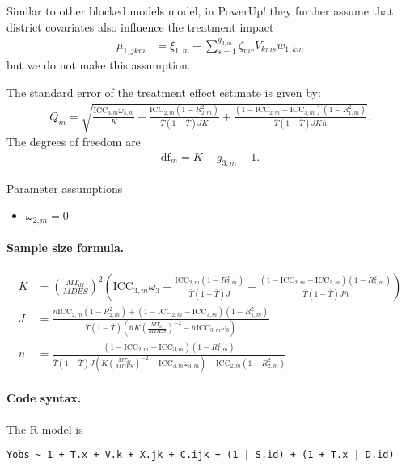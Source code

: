\documentclass[12pt]{article}
\begin{document}
Similar to other blocked models model, in PowerUp! they further assume that district covariates also influence the treatment impact
\begin{align*}
\mu_{1,jkm} &= \xi_{1,m} + \sum_{s=1}^{g_{3,m}} \zeta_{mr} V_{kms} w_{1,km}
\end{align*}
but we do not make this assumption.

The standard error of the treatment effect estimate is given by:
\begin{align}
Q_m = \sqrt{
\frac{\text{ICC}_{3,m} \omega_{3,m}}{K} +
\frac{\text{ICC}_{2,m}(1 - R^2_{2,m})}{\bar{T}(1 - \bar{T}) J K } +
\frac{(1-\text{ICC}_{2,m} - \text{ICC}_{3,m})(1-R^2_{1,m})}{\bar{T}(1 - \bar{T}) J K\bar{n}} }.\end{align}
The degrees of freedom are
\begin{align}\text{df}_m = K - g_{3,m} - 1.\end{align}

Parameter assumptions
\begin{itemize}
\item $\omega_{2,m} = 0$
\end{itemize}


\paragraph{Sample size formula.} 
\begin{align}
K &= \left(\frac{MT_{df}}{MDES}\right)^2 \left( \text{ICC}_{3,m} \omega_3  +  \frac{\text{ICC}_{2,m} (1-R_{2,m}^2)}{\bar{T}(1 - \bar{T}) J} + \frac{(1-\text{ICC}_{2,m}-\text{ICC}_{3,m})(1-R^2_{1,m})}{\bar{T}(1 - \bar{T}) J \bar{n}} \right)\\
J &=  \frac{\bar{n}\text{ICC}_{2,m} (1-R_{2,m}^2) + (1-\text{ICC}_{2,m}-\text{ICC}_{3,m})(1-R^2_{1,m})}{\bar{T}(1 - \bar{T})\left(\bar{n} K \left(\frac{MT_{df}}{MDES}\right)^{-2} - \bar{n} \text{ICC}_{3,m} \omega_3\right)}\\
\bar{n} &= \frac{(1-\text{ICC}_{2,m}-\text{ICC}_{3,m})(1-R^2_{1,m})}{\bar{T}(1 - \bar{T})J \left(K \left(\frac{MT_{df}}{MDES}\right)^{-2} -  \text{ICC}_{3,m}\omega_{3,m}\right) -  \text{ICC}_{2,m} (1-R_{2,m}^2)}
\end{align}

\paragraph{Code syntax.}
The R model is
\begin{verbatim}
Yobs ~ 1 + T.x + V.k + X.jk + C.ijk + (1 | S.id) + (1 + T.x | D.id)
\end{verbatim}
\end{document}
